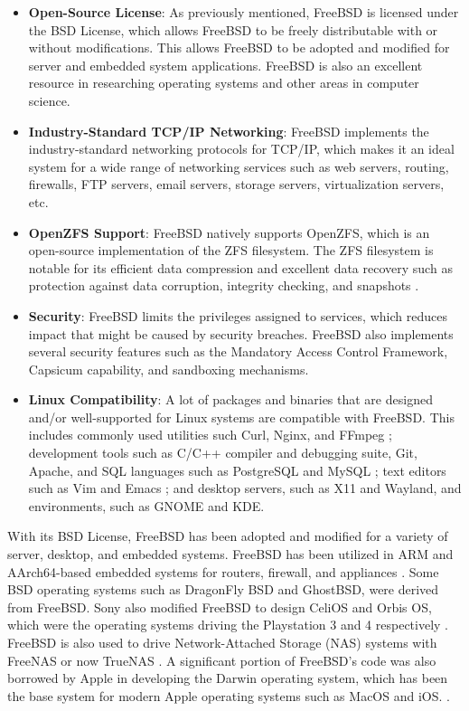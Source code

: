 \begin{itemize}
	\item \textbf{Open-Source License}: As previously mentioned, FreeBSD is licensed under the BSD License, which
	      allows FreeBSD to be freely distributable with or without modifications. This allows FreeBSD to be adopted
	      and modified for server and embedded system applications. FreeBSD is also an excellent resource in researching
	      operating systems and other areas in computer science.

	\item \textbf{Industry-Standard TCP/IP Networking}: FreeBSD implements the industry-standard networking protocols
	      for TCP/IP, which makes it an ideal system for a wide range of networking services such as web servers, routing,
	      firewalls, FTP servers, email servers, storage servers, virtualization servers, etc.

	\item \textbf{OpenZFS Support}: FreeBSD natively supports OpenZFS, which is an open-source implementation of
	      the ZFS filesystem. The ZFS filesystem is notable for its efficient data compression and excellent data recovery
	      such as protection against data corruption, integrity checking, and snapshots \parencite{openzfs_project}.

	\item \textbf{Security}: FreeBSD limits the privileges assigned to services, which reduces impact that might
	      be caused by security breaches. FreeBSD also implements several security features such as the Mandatory Access
	      Control Framework, Capsicum capability, and sandboxing mechanisms.

	\item \textbf{Linux Compatibility}: A lot of packages and binaries that are designed and/or well-supported for Linux systems are
	      compatible with FreeBSD. This includes commonly used utilities such Curl, Nginx, and FFmpeg \parencite{freebsd_ch12};
	      development tools such as C/C++ compiler and debugging suite, Git, Apache, and SQL languages such as PostgreSQL and
	      MySQL \parencite{freebsd_ch12}; text editors such as Vim and Emacs \parencite{freebsd_ch12}; and desktop servers,
	      such as X11 and Wayland, and environments, such as GNOME and KDE.
\end{itemize}

With its BSD License, FreeBSD has been adopted and modified for a variety of server, desktop, and embedded systems.
FreeBSD has been utilized in ARM and AArch64-based embedded systems for routers, firewall, and appliances \parencite{freebsd_intro}.
Some BSD operating systems such as DragonFly BSD and GhostBSD, were derived from FreeBSD. Sony also modified FreeBSD
to design CeliOS and Orbis OS, which were the operating systems driving the Playstation 3 and 4 respectively
\parencites{sony2019}{larabel2013}. FreeBSD is also used to drive Network-Attached Storage (NAS) systems
with FreeNAS or now TrueNAS \parencite{posch2024}. A significant portion of FreeBSD's code was also borrowed by Apple
in developing the Darwin operating system, which has been the base system for modern Apple operating systems such
as MacOS and iOS. \parencite{apple2002}.
